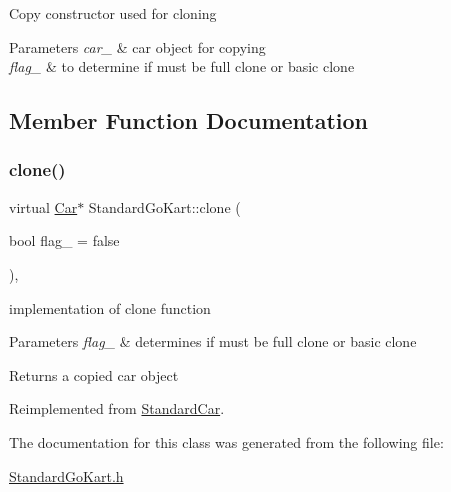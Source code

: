 Copy constructor used for cloning 
\begin{DoxyParams}{Parameters}
{\em car\+\_\+} & car object for copying \\
\hline
{\em flag\+\_\+} & to determine if must be full clone or basic clone\\
\hline
\end{DoxyParams}


\subsection{Member Function Documentation}
\mbox{\label{class_standard_go_kart_aec5a6e2e21ab80b0ee072bbcdcf0323a}} 
\subsubsection{\texorpdfstring{clone()}{clone()}}
{\footnotesize\ttfamily virtual \mbox{\hyperlink{class_car}{Car}}$\ast$ Standard\+Go\+Kart\+::clone (\begin{DoxyParamCaption}\item[{bool}]{flag\+\_\+ = {\ttfamily false} }\end{DoxyParamCaption})\hspace{0.3cm}{\ttfamily [inline]}, {\ttfamily [virtual]}}

implementation of clone function 
\begin{DoxyParams}{Parameters}
{\em flag\+\_\+} & determines if must be full clone or basic clone \\
\hline
\end{DoxyParams}
\begin{DoxyReturn}{Returns}
a copied car object 
\end{DoxyReturn}


Reimplemented from \mbox{\hyperlink{class_standard_car_a2fd5dd06bebd68db247bab73bd2176be}{Standard\+Car}}.



The documentation for this class was generated from the following file\+:\begin{DoxyCompactItemize}
\item 
\mbox{\hyperlink{_standard_go_kart_8h}{Standard\+Go\+Kart.\+h}}\end{DoxyCompactItemize}
